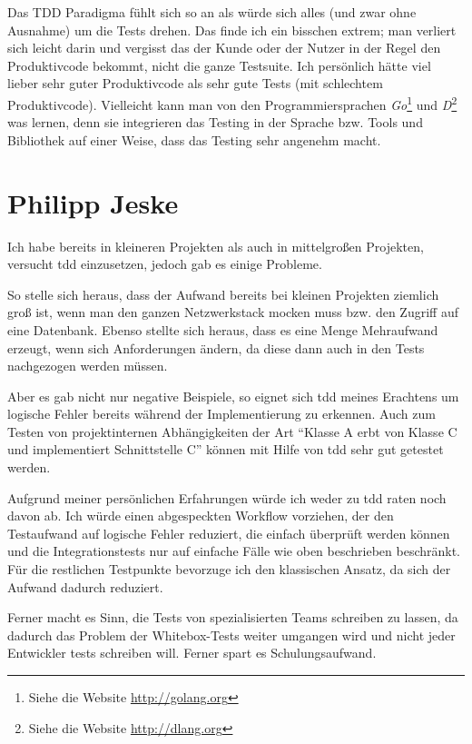 \documentclass{mitschrift}
\newcommand{\pje}{\marginpar{Philipp\\Jeske}}
\begin{document}
Das TDD Paradigma fühlt sich so an als würde sich alles (und zwar ohne
Ausnahme) um die Tests drehen. Das finde ich ein bisschen extrem; man verliert
sich leicht darin und vergisst das der Kunde oder der Nutzer in der Regel den
Produktivcode bekommt, nicht die ganze Testsuite. Ich persönlich hätte viel
lieber sehr guter Produktivcode als sehr gute Tests (mit schlechtem
Produktivcode). Vielleicht kann man von den Programmiersprachen
\emph{Go}\footnote{Siehe die Website \url{http://golang.org}} und
\emph{D}\footnote{Siehe die Website \url{http://dlang.org}} was lernen, denn
sie integrieren das Testing in der Sprache bzw. Tools und Bibliothek auf einer
Weise, dass das Testing sehr angenehm macht.

\section{Philipp Jeske}\label{Erfahrungsbericht Philipp}\pje
Ich habe bereits in kleineren Projekten als auch in mittelgroßen Projekten,
versucht \gls{tdd} einzusetzen, jedoch gab es einige Probleme. 

So stelle sich heraus, dass der Aufwand bereits bei kleinen Projekten ziemlich
groß ist, wenn man den ganzen Netzwerkstack mocken muss bzw. den Zugriff auf
eine Datenbank. Ebenso stellte sich heraus, dass es eine Menge Mehraufwand
erzeugt, wenn sich Anforderungen ändern, da diese dann auch in den Tests
nachgezogen werden müssen.

Aber es gab nicht nur negative Beispiele, so eignet sich \gls{tdd} meines
Erachtens um logische Fehler bereits während der Implementierung zu erkennen.
Auch zum Testen von projektinternen Abhängigkeiten der Art "`Klasse A erbt von
Klasse C und implementiert Schnittstelle C"' können mit Hilfe von \gls{tdd}
sehr gut getestet werden.

Aufgrund meiner persönlichen Erfahrungen würde ich weder zu \gls{tdd} raten
noch davon ab. Ich würde einen abgespeckten Workflow vorziehen, der den
Testaufwand auf logische Fehler reduziert, die einfach überprüft werden können
und die Integrationstests nur auf einfache Fälle wie oben beschrieben
beschränkt. Für die restlichen Testpunkte bevorzuge ich den klassischen Ansatz,
da sich der Aufwand dadurch reduziert.

Ferner macht es Sinn, die Tests von spezialisierten Teams schreiben zu lassen,
da dadurch das Problem der Whitebox-Tests weiter umgangen wird und nicht jeder
Entwickler tests schreiben will. Ferner spart es Schulungsaufwand.

\printbibliography
%
%

\printglossary
\end{document}
